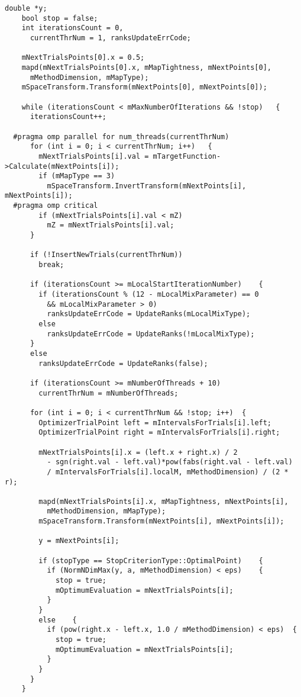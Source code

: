 \begin{lstlisting}[frame=single]
    double *y;
    bool stop = false;
    int iterationsCount = 0,
      currentThrNum = 1, ranksUpdateErrCode;

    mNextTrialsPoints[0].x = 0.5;
    mapd(mNextTrialsPoints[0].x, mMapTightness, mNextPoints[0],
      mMethodDimension, mMapType);
    mSpaceTransform.Transform(mNextPoints[0], mNextPoints[0]);

    while (iterationsCount < mMaxNumberOfIterations && !stop)	{
      iterationsCount++;

  #pragma omp parallel for num_threads(currentThrNum)
      for (int i = 0; i < currentThrNum; i++)	{
        mNextTrialsPoints[i].val = mTargetFunction->Calculate(mNextPoints[i]);
        if (mMapType == 3)
          mSpaceTransform.InvertTransform(mNextPoints[i], mNextPoints[i]);
  #pragma omp critical
        if (mNextTrialsPoints[i].val < mZ)
          mZ = mNextTrialsPoints[i].val;
      }

      if (!InsertNewTrials(currentThrNum))
        break;

      if (iterationsCount >= mLocalStartIterationNumber)	{
        if (iterationsCount % (12 - mLocalMixParameter) == 0
          && mLocalMixParameter > 0)
          ranksUpdateErrCode = UpdateRanks(mLocalMixType);
        else
          ranksUpdateErrCode = UpdateRanks(!mLocalMixType);
      }
      else
        ranksUpdateErrCode = UpdateRanks(false);

      if (iterationsCount >= mNumberOfThreads + 10)
        currentThrNum = mNumberOfThreads;

      for (int i = 0; i < currentThrNum && !stop; i++)	{
        OptimizerTrialPoint left = mIntervalsForTrials[i].left;
        OptimizerTrialPoint right = mIntervalsForTrials[i].right;

        mNextTrialsPoints[i].x = (left.x + right.x) / 2
          - sgn(right.val - left.val)*pow(fabs(right.val - left.val)
          / mIntervalsForTrials[i].localM, mMethodDimension) / (2 * r);

        mapd(mNextTrialsPoints[i].x, mMapTightness, mNextPoints[i],
          mMethodDimension, mMapType);
        mSpaceTransform.Transform(mNextPoints[i], mNextPoints[i]);

        y = mNextPoints[i];

        if (stopType == StopCriterionType::OptimalPoint)	{
          if (NormNDimMax(y, a, mMethodDimension) < eps)	{
            stop = true;
            mOptimumEvaluation = mNextTrialsPoints[i];
          }
        }
        else	{
          if (pow(right.x - left.x, 1.0 / mMethodDimension) < eps)	{
            stop = true;
            mOptimumEvaluation = mNextTrialsPoints[i];
          }
        }
      }
    }


\end{lstlisting}
